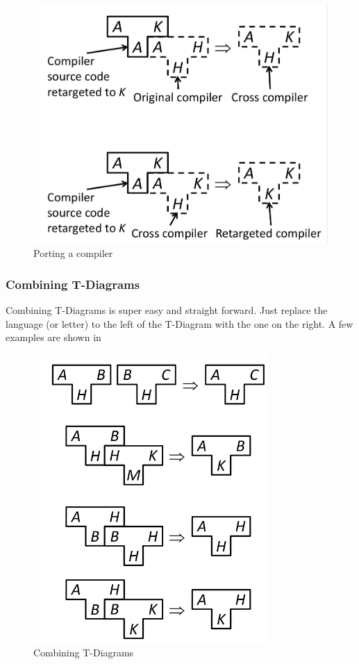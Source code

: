 \documentclass{article}
\begin{document}
\begin{figure}[h]
	\center
	\includegraphics[width=\textwidth]{porting.png}
	\caption{Porting a compiler}
	\label{fig:porting}
\end{figure}

\subsubsection{Combining T-Diagrams}
Combining T-Diagrams is super easy and straight forward.
Just replace the language (or letter) to the left of the T-Diagram with the one on the right.
A few examples are shown in 

\begin{figure}[h]
	\center
	\includegraphics[width=0.8\textwidth]{tcombining.png}
	\caption{Combining T-Diagrams}
	\label{fig:tcombining}
\end{figure}
\end{document}
